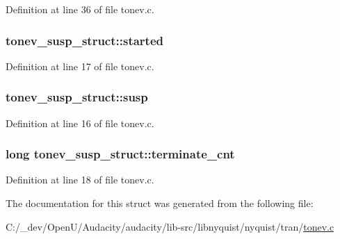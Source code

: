 Definition at line 36 of file tonev.\+c.

\subsubsection[{\texorpdfstring{started}{started}}]{ tonev\+\_\+susp\+\_\+struct\+::started}\hypertarget{structtonev__susp__struct_a8c111657d5ddc33270f50a9b6a785147}{}\label{structtonev__susp__struct_a8c111657d5ddc33270f50a9b6a785147}


Definition at line 17 of file tonev.\+c.

\subsubsection[{\texorpdfstring{susp}{susp}}]{ tonev\+\_\+susp\+\_\+struct\+::susp}\hypertarget{structtonev__susp__struct_aaca45d0c0b13e73fff441ff7473fd113}{}\label{structtonev__susp__struct_aaca45d0c0b13e73fff441ff7473fd113}


Definition at line 16 of file tonev.\+c.

\subsubsection[{\texorpdfstring{terminate\+\_\+cnt}{terminate_cnt}}]{\setlength{\rightskip}{0pt plus 5cm}long tonev\+\_\+susp\+\_\+struct\+::terminate\+\_\+cnt}\hypertarget{structtonev__susp__struct_ae8cfac673ead57d568e3110f9b95bcad}{}\label{structtonev__susp__struct_ae8cfac673ead57d568e3110f9b95bcad}


Definition at line 18 of file tonev.\+c.



The documentation for this struct was generated from the following file\+:\begin{DoxyCompactItemize}
\item 
C\+:/\+\_\+dev/\+Open\+U/\+Audacity/audacity/lib-\/src/libnyquist/nyquist/tran/\hyperlink{tonev_8c}{tonev.\+c}\end{DoxyCompactItemize}
